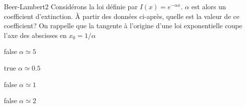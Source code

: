         \begin{question}{27}{Beer-Lambert}{2}{}
            Considérons la loi définie par $I(x) = e^{-\alpha x}$. $\alpha$ est alors un coefficient d'extinction. À partir des données ci-après, quelle est la valeur de ce coefficient? On rappelle que la tangente à l'origine d'une loi exponentielle coupe l'axe des abscisses en $x_0 = 1/\alpha$
            \begin{figure}
             \end{figure}
        \end{question}
        \begin{reponses}
            \item[false] $\alpha \simeq \num{5}$
		    \item[true] $\alpha \simeq \num{0.5}$
		    \item[false] $\alpha \simeq \num{1}$
		    \item[false] $\alpha \simeq \num{2}$
		    \end{reponses}
